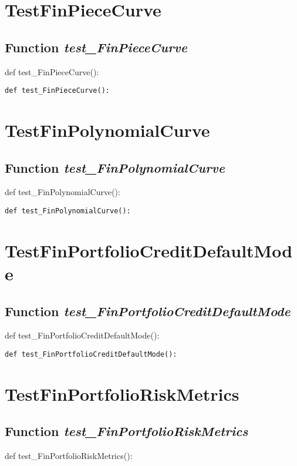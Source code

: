 \documentclass[twoside,11pt]{book}
\begin{document}
\newpage
\section{TestFinPieceCurve}

\subsection{Function {\it test\_FinPieceCurve}}
def test\_FinPieceCurve():

\begin{lstlisting}
def test_FinPieceCurve():
\end{lstlisting}


\newpage
\section{TestFinPolynomialCurve}

\subsection{Function {\it test\_FinPolynomialCurve}}
def test\_FinPolynomialCurve():

\begin{lstlisting}
def test_FinPolynomialCurve():
\end{lstlisting}


\newpage
\section{TestFinPortfolioCreditDefaultMode}

\subsection{Function {\it test\_FinPortfolioCreditDefaultMode}}
def test\_FinPortfolioCreditDefaultMode():

\begin{lstlisting}
def test_FinPortfolioCreditDefaultMode():
\end{lstlisting}


\newpage
\section{TestFinPortfolioRiskMetrics}

\subsection{Function {\it test\_FinPortfolioRiskMetrics}}
def test\_FinPortfolioRiskMetrics():
\end{document}
